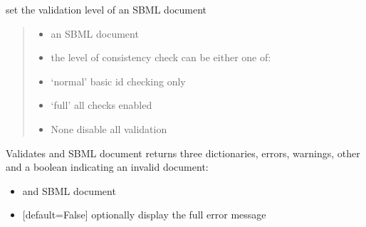 \documentclass[letterpaper,10pt,english]{sphinxmanual}
\begin{document}
\begin{fulllineitems}
\label{\detokenize{modules_doc:cbmpy.CBXML.sbml_setValidationOptions}}
\pysigstartsignatures
{}
\pysigstopsignatures
\sphinxAtStartPar
set the validation level of an SBML document
\begin{quote}
\begin{itemize}
\item {} 
\sphinxAtStartPar
{} an SBML document

\item {} 
\sphinxAtStartPar
{} the level of consistency check can be either one of:

\end{itemize}
\begin{itemize}
\item {} 
\sphinxAtStartPar
‘normal’ basic id checking only

\item {} 
\sphinxAtStartPar
‘full’ all checks enabled

\item {} 
\sphinxAtStartPar
None disable all validation

\end{itemize}
\end{quote}

\end{fulllineitems}


\begin{fulllineitems}
\label{\detokenize{modules_doc:cbmpy.CBXML.sbml_validateDocument}}
\pysigstartsignatures
{}
\pysigstopsignatures
\sphinxAtStartPar
Validates and SBML document returns three dictionaries, errors, warnings, other and a boolean indicating an invalid document:
\begin{itemize}
\item {} 
\sphinxAtStartPar
{} and SBML document

\item {} 
\sphinxAtStartPar
{} {[}default=False{]} optionally display the full error message

\end{itemize}

\end{fulllineitems}
\end{document}
